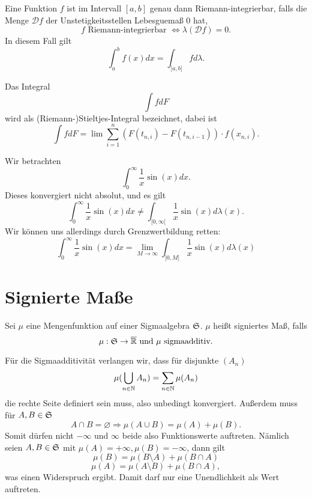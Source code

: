 		\begin{satz}
			Eine Funktion $f$ ist im Intervall $[a,b]$ genau dann Riemann-integrierbar, falls die Menge $\mathcal{D}f$ der Unstetigkeitsstellen Lebesguemaß 0 hat,
			\[ f\text{ Riemann-integrierbar }\Leftrightarrow \lambda(\mathcal{D}f)=0. \]
			In diesem Fall gilt
			\[ \int_a^bf(x)dx=\int_{]a,b]} fd\lambda. \]
		\end{satz}
		
		\begin{defi}
			Das Integral
			\[ \int fdF \]
			wird als (Riemann-)Stieltjes-Integral bezeichnet, dabei ist
			\[ \int fdF=\lim \sum_{i=1}^n (F(t_{n,i})-F(t_{n,i-1}))\cdot f(x_{n,i}). \]
		\end{defi}
		
		\begin{bsp}
			Wir betrachten
			\[ \int_0^\infty \frac{1}{x}\sin(x)dx. \]
			Dieses konvergiert nicht absolut, und es gilt
			\[ \int_0^\infty \frac{1}{x}\sin(x)dx\neq\int_{[0,\infty[}\frac{1}{x}\sin(x)d\lambda(x). \]
			Wir können uns allerdings durch Grenzwertbildung retten:
			\[ \int_0^\infty \frac{1}{x}\sin(x)dx=\lim_{M\to\infty}\int_{]0,M]}\frac{1}{x}\sin(x)d\lambda(x) \]
		\end{bsp}
		
	\chapter{Signierte Maße}
		\begin{defi}
			Sei $\mu$ eine Mengenfunktion auf einer Sigmaalgebra $\mathfrak{S}$. $\mu$ heißt signiertes Maß, falls
			\[ \mu:\mathfrak{S}\to\overline{\mathbb{R}}\text{ und }\mu \text{ sigmaadditiv}. \]
		\end{defi}
		
		\begin{bem}
			Für die Sigmaadditivität verlangen wir, dass für disjunkte $(A_n)$
			\[ \mu(\bigcup_{n\in\mathbb{N}}A_n)=\sum_{n\in\mathbb{N}}\mu(A_n) \]
			die rechte Seite definiert sein muss, also unbedingt konvergiert. Außerdem muss für $A,B\in\mathfrak{S}$
			\[ A\cap B=\varnothing\Rightarrow \mu(A\cup B)=\mu(A)+\mu(B). \]
			Somit dürfen nicht $-\infty$ und $\infty$ beide also Funktionswerte auftreten. Nämlich seien $A,B\in\mathfrak{S}$ mit $\mu(A)=+\infty, \mu(B)=-\infty$, dann gilt
			\[ \mu(B)=\mu(B\setminus A)+\mu(B\cap A) \]
			\[ \mu(A)=\mu(A\setminus B)+\mu(B\cap A), \]
			was einen Widerspruch ergibt. Damit darf nur eine Unendlichkeit als Wert auftreten. 
		\end{bem}
		
